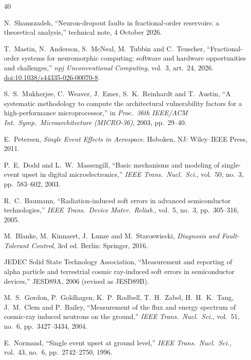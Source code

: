 \documentclass[11pt,a4paper]{article}
\begin{document}
\begin{thebibliography}{40}

N.~Shamszadeh,
``Neuron-dropout faults in fractional-order reservoirs: a theoretical analysis,''
technical note, 4 October 2026.

T.~Mastin, N.~Anderson, S.~McNeal, M.~Tubbin and C.~Teuscher,
``Fractional-order systems for neuromorphic computing: software and hardware opportunities and challenges,''
\emph{npj Unconventional Computing}, vol.~3, art.~24, 2026.
\href{https://doi.org/10.1038/s44335-026-00070-8}{doi:10.1038/s44335-026-00070-8}.

S.~S.~Mukherjee, C.~Weaver, J.~Emer, S.~K.~Reinhardt and T.~Austin,
``A systematic methodology to compute the architectural vulnerability factors for a high-performance microprocessor,''
in \emph{Proc.\ 36th IEEE/ACM Int.\ Symp.\ Microarchitecture (MICRO-36)}, 2003, pp.~29--40.

E.~Petersen,
\emph{Single Event Effects in Aerospace}.
Hoboken, NJ: Wiley--IEEE Press, 2011.

P.~E.~Dodd and L.~W.~Massengill,
``Basic mechanisms and modeling of single-event upset in digital microelectronics,''
\emph{IEEE Trans.\ Nucl.\ Sci.}, vol.~50, no.~3, pp.~583--602, 2003.

R.~C.~Baumann,
``Radiation-induced soft errors in advanced semiconductor technologies,''
\emph{IEEE Trans.\ Device Mater.\ Reliab.}, vol.~5, no.~3, pp.~305--316, 2005.

M.~Blanke, M.~Kinnaert, J.~Lunze and M.~Staroswiecki,
\emph{Diagnosis and Fault-Tolerant Control}, 3rd ed.
Berlin: Springer, 2016.

JEDEC Solid State Technology Association,
``Measurement and reporting of alpha particle and terrestrial cosmic ray-induced soft errors in semiconductor devices,''
JESD89A, 2006 (revised as JESD89B).

M.~S.~Gordon, P.~Goldhagen, K.~P.~Rodbell, T.~H.~Zabel, H.~H.~K.~Tang, J.~M.~Clem and P.~Bailey,
``Measurement of the flux and energy spectrum of cosmic-ray induced neutrons on the ground,''
\emph{IEEE Trans.\ Nucl.\ Sci.}, vol.~51, no.~6, pp.~3427--3434, 2004.

E.~Normand,
``Single event upset at ground level,''
\emph{IEEE Trans.\ Nucl.\ Sci.}, vol.~43, no.~6, pp.~2742--2750, 1996.


\end{thebibliography}
\end{document}
